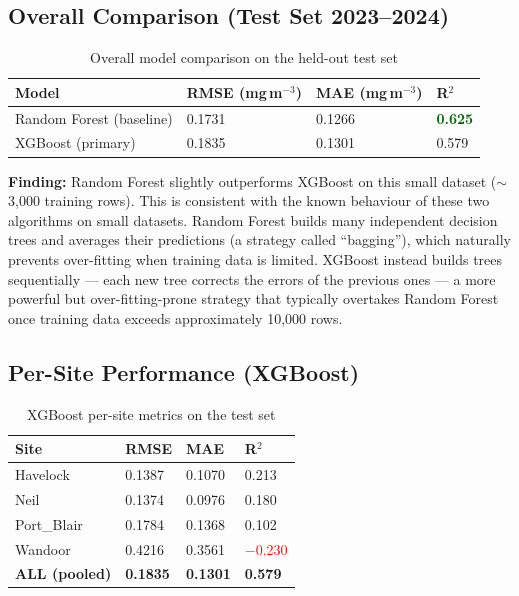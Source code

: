 \documentclass[12pt,a4paper]{report}
\begin{document}
\subsection{Overall Comparison (Test Set 2023--2024)}

\begin{table}[H]
\centering
\caption{Overall model comparison on the held-out test set}
\begin{tabular}{L{5cm}R{3cm}R{3cm}R{3cm}}
\toprule
\textbf{Model} & \textbf{RMSE} (mg\,m$^{-3}$) & \textbf{MAE} (mg\,m$^{-3}$) & \textbf{R$^2$} \\
\midrule
{}
Random Forest (baseline) & 0.1731 & 0.1266 & \textcolor{darkgreen}{\textbf{0.625}} \\
XGBoost (primary)        & 0.1835 & 0.1301 & 0.579 \\
\bottomrule
\end{tabular}
\label{tab:overall_metrics}
\end{table}

\begin{findingbox}
\textbf{Finding:} Random Forest slightly outperforms XGBoost on this small dataset
($\sim$3,000 training rows). This is consistent with the known behaviour of these two algorithms on small datasets.
Random Forest builds many independent decision trees and averages their predictions
(a strategy called ``bagging''), which naturally prevents over-fitting when training
data is limited. XGBoost instead builds trees sequentially — each new tree corrects
the errors of the previous ones — a more powerful but over-fitting-prone strategy
that typically overtakes Random Forest once training data exceeds approximately 10,000
rows.
\end{findingbox}

\subsection{Per-Site Performance (XGBoost)}

\begin{table}[H]
\centering
\caption{XGBoost per-site metrics on the test set}
\begin{tabular}{L{4cm}R{3cm}R{3cm}R{3cm}}
\toprule
\textbf{Site} & \textbf{RMSE} & \textbf{MAE} & \textbf{R$^2$} \\
\midrule
{}
Havelock         & 0.1387 & 0.1070 & 0.213 \\
Neil             & 0.1374 & 0.0976 & 0.180 \\
Port\_Blair      & 0.1784 & 0.1368 & 0.102 \\
Wandoor          & 0.4216 & 0.3561 & \textcolor{red}{$-$0.230} \\
\midrule
{}
\textbf{ALL (pooled)} & \textbf{0.1835} & \textbf{0.1301} & \textbf{0.579} \\
\bottomrule
\end{tabular}
\label{tab:persite_metrics}
\end{table}
\end{document}
